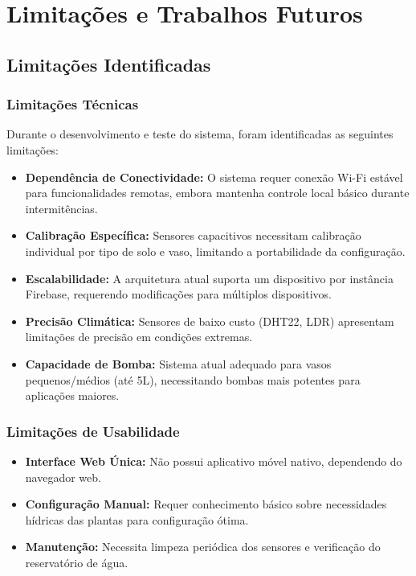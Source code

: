 
\chapter{Limitações e Trabalhos Futuros}

\section{Limitações Identificadas}

\subsection{Limitações Técnicas}
Durante o desenvolvimento e teste do sistema, foram identificadas as seguintes limitações:

\begin{itemize}
    \item \textbf{Dependência de Conectividade:} O sistema requer conexão Wi-Fi estável para funcionalidades remotas, embora mantenha controle local básico durante intermitências.
    \item \textbf{Calibração Específica:} Sensores capacitivos necessitam calibração individual por tipo de solo e vaso, limitando a portabilidade da configuração.
    \item \textbf{Escalabilidade:} A arquitetura atual suporta um dispositivo por instância Firebase, requerendo modificações para múltiplos dispositivos.
    \item \textbf{Precisão Climática:} Sensores de baixo custo (DHT22, LDR) apresentam limitações de precisão em condições extremas.
    \item \textbf{Capacidade de Bomba:} Sistema atual adequado para vasos pequenos/médios (até 5L), necessitando bombas mais potentes para aplicações maiores.
\end{itemize}

\subsection{Limitações de Usabilidade}
\begin{itemize}
    \item \textbf{Interface Web Única:} Não possui aplicativo móvel nativo, dependendo do navegador web.
    \item \textbf{Configuração Manual:} Requer conhecimento básico sobre necessidades hídricas das plantas para configuração ótima.
    \item \textbf{Manutenção:} Necessita limpeza periódica dos sensores e verificação do reservatório de água.
\end{itemize}

